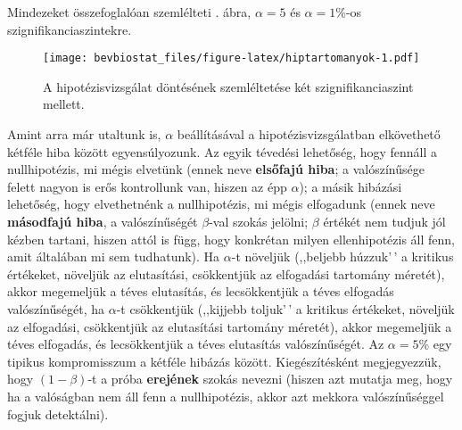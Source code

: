 \documentclass[
]{book}
\begin{document}
Mindezeket összefoglalóan szemlélteti . ábra, \(\alpha=5\) és \(\alpha=1\)\%-os szignifikanciaszintekre.

\begin{figure}
\centering
\texttt{[image: bevbiostat\_files/figure-latex/hiptartomanyok-1.pdf]}
\caption{\label{fig:hiptartomanyok}A hipotézisvizsgálat döntésének szemléltetése két szignifikanciaszint mellett.}
\end{figure}

Amint arra már utaltunk is, \(\alpha\) beállításával a hipotézisvizsgálatban elkövethető kétféle hiba között egyensúlyozunk. Az egyik tévedési lehetőség, hogy fennáll a nullhipotézis, mi mégis elvetünk (ennek neve \textbf{elsőfajú hiba}; a valószínűsége felett nagyon is erős kontrollunk van, hiszen az épp \(\alpha\)); a másik hibázási lehetőség, hogy elvethetnénk a nullhipotézis, mi mégis elfogadunk (ennek neve \textbf{másodfajú hiba}, a valószínűségét \(\beta\)-val szokás jelölni; \(\beta\) értékét nem tudjuk jól kézben tartani, hiszen attól is függ, hogy konkrétan milyen ellenhipotézis áll fenn, amit általában mi sem tudhatunk). Ha \(\alpha\)-t növeljük (,,beljebb húzzuk'\,' a kritikus értékeket, növeljük az elutasítási, csökkentjük az elfogadási tartomány méretét), akkor megemeljük a téves elutasítás, és lecsökkentjük a téves elfogadás valószínűségét, ha \(\alpha\)-t csökkentjük (,,kijjebb toljuk'\,' a kritikus értékeket, növeljük az elfogadási, csökkentjük az elutasítási tartomány méretét), akkor megemeljük a téves elfogadás, és lecsökkentjük a téves elutasítás valószínűségét. Az \(\alpha=5\)\% egy tipikus kompromisszum a kétféle hibázás között. Kiegészítésként megjegyezzük, hogy \(\left(1-\beta\right)\)-t a próba \textbf{erejének} szokás nevezni (hiszen azt mutatja meg, hogy ha a valóságban nem áll fenn a nullhipotézis, akkor azt mekkora valószínűséggel fogjuk detektálni).
\end{document}
